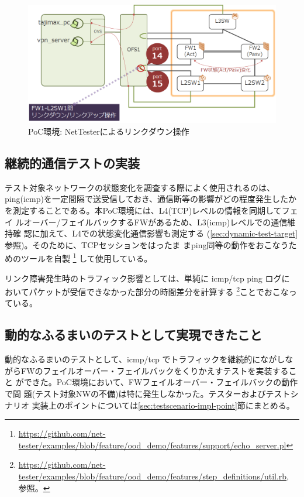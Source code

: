 \begin{figure}[h]
 \centering
 \includegraphics[scale=0.6]{img/poc-env-linkdown.png}
 \caption{PoC環境: NetTesterによるリンクダウン操作}
 \label{fig:poc-env-linkdown}
\end{figure}

  \subsection{継続的通信テストの実装}

テスト対象ネットワークの状態変化を調査する際によく使用されるのは、
ping(icmp)を一定間隔で送受信しておき、通信断等の影響がどの程度発生したか
を測定することである。本PoC環境には、L4(TCP)レベルの情報を同期してフェイ
ルオーバー/フェイルバックするFWがあるため、L3(icmp)レベルでの通信維持確
認に加えて、L4での状態変化通信影響も測定する
(\ref{sec:dynamic-test-target}参照)。そのために、TCPセッションをはったま
まping同等の動作をおこなうためのツールを自製
\footnote{\url{https://github.com/net-tester/examples/blob/feature/ood_demo/features/support/echo_server.pl}}
して使用している。

リンク障害発生時のトラフィック影響としては、単純に icmp/tcp ping ログに
おいてパケットが受信できなかった部分の時間差分を計算する
\footnote{\url{https://github.com/net-tester/examples/blob/feature/ood_demo/features/step_definitions/util.rb},
参照。}ことでおこなっている。

  \subsection{動的なふるまいのテストとして実現できたこと}
  \label{sec:dynamic-test-result}

動的なふるまいのテストとして、icmp/tcp でトラフィックを継続的にながしな
がらFWのフェイルオーバー・フェイルバックをくりかえすテストを実装すること
ができた。PoC環境において、FWフェイルオーバー・フェイルバックの動作で問
題(テスト対象NWの不備)は特に発生しなかった。テスターおよびテストシナリオ
実装上のポイントについては\ref{sec:testscenario-impl-point}節にまとめる。

